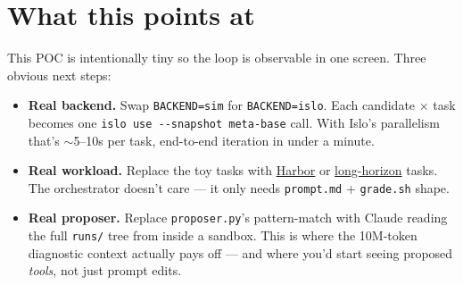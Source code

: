 \documentclass[11pt]{article}
\begin{document}
\begin{center}
\end{center}

\section*{What this points at}

This POC is intentionally tiny so the loop is observable in one screen.
Three obvious next steps:

\begin{itemize}[leftmargin=1.2em,itemsep=0.2em]
  \item \textbf{Real backend.} Swap \texttt{BACKEND=sim} for
        \texttt{BACKEND=islo}. Each candidate $\times$ task becomes one
        \texttt{islo use -{}-snapshot meta-base} call. With Islo's
        parallelism that's $\sim$5--10s per task, end-to-end iteration in
        under a minute.
  \item \textbf{Real workload.} Replace the toy tasks with
        \href{https://github.com/islo-labs/harbor}{Harbor} or
        \href{https://github.com/islo-labs/long-horizon}{long-horizon} tasks.
        The orchestrator doesn't care --- it only needs \texttt{prompt.md} +
        \texttt{grade.sh} shape.
  \item \textbf{Real proposer.} Replace \texttt{proposer.py}'s pattern-match
        with Claude reading the full \texttt{runs/} tree from inside a
        sandbox. This is where the 10M-token diagnostic context actually
        pays off --- and where you'd start seeing proposed \emph{tools}, not
        just prompt edits.
\end{itemize}
\end{document}
